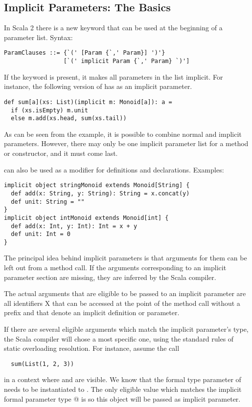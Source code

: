 \documentclass[a4paper,11pt,twoside]{article}
\begin{document}
\subsection*{Implicit Parameters: The Basics}

In Scala 2 there is a new \lstinline@implicit@ keyword that can be
used at the beginning of a parameter list. Syntax:
\begin{lstlisting}
ParamClauses ::= {`(' [Param {`,' Param}] ')'} 
                 [`(' implicit Param {`,' Param} `)']
\end{lstlisting}
If the keyword is present, it makes all parameters in the list
implicit.  
For instance, the following version of \lstinline@sum@ has
\lstinline@m@ as an implicit parameter.
\begin{lstlisting}
def sum[a](xs: List)(implicit m: Monoid[a]): a = 
  if (xs.isEmpty) m.unit
  else m.add(xs.head, sum(xs.tail))
\end{lstlisting}
As can be seen from the example, it is possible to combine normal and
implicit parameters. However, there may only be one implicit parameter
list for a method or constructor, and it must come last.

\lstinline@implicit@ can also be used as a modifier for definitions
and declarations. Examples:

\begin{lstlisting}
implicit object stringMonoid extends Monoid[String] {
  def add(x: String, y: String): String = x.concat(y)
  def unit: String = ""
}
implicit object intMonoid extends Monoid[int] {
  def add(x: Int, y: Int): Int = x + y
  def unit: Int = 0
}
\end{lstlisting}

The principal idea behind implicit parameters is that arguments for
them can be left out from a method call. If the arguments
corresponding to an implicit parameter section are missing, they are
inferred by the Scala compiler.

The actual arguments that are eligible to be passed to an implicit
parameter are all identifiers X that can be accessed at the point
of the method call without a prefix and that denote an implicit
definition or parameter.

If there are several eligible arguments which match the implicit
parameter's type, the Scala compiler will chose a most specific one,
using the standard rules of static overloading resolution.
For instance, assume the call
\begin{lstlisting}
  sum(List(1, 2, 3))
\end{lstlisting}
in a context where \lstinline@stringMonoid@ and \lstinline@intMonoid@
are visible.  We know that the formal type parameter \lstinline@a@ of
\lstinline@sum@ needs to be instantiated to \lstinline@Int@. The only
eligible value which matches the implicit formal parameter type
\lstinline@Monoid[Int]@ is \lstinline@intMonoid@ so this object will
be passed as implicit parameter.
\end{document}
